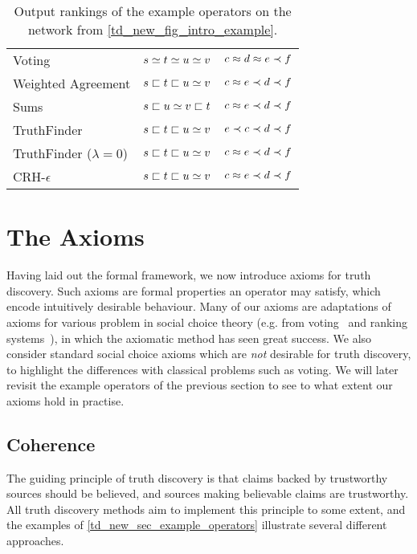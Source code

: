 \begin{table}
    \centering
	\caption{Output rankings of the example operators on the network from
    \cref{td_new_fig_intro_example}.}
	\begin{tabular}{lcc}
    \toprule
    Voting             & $s \simeq t \simeq u \simeq v$ & $c \approx d \approx e \prec f$ \\
    Weighted Agreement & $s \sqsubset t \sqsubset u \simeq v$ & $c \approx e \prec d \prec f$ \\
    Sums               & $s \sqsubset u \simeq v \sqsubset t$ & $c \approx e \prec d \prec f$ \\
    TruthFinder        & $s \sqsubset t \sqsubset u \simeq v$ & $e \prec c \prec d \prec f$ \\
    TruthFinder ($\lambda = 0$) & $s \sqsubset t \sqsubset u \simeq v$ & $c \approx e \prec d \prec f$ \\
    CRH-$\epsilon$     & $s \sqsubset t \sqsubset u \simeq v$ & $c \approx e \prec d \prec f$ \\
    \bottomrule
	\end{tabular}
    \label{td_new_tab_example_outputs}
\end{table}

\section{The Axioms}
\label{td_new_sec_axioms}

Having laid out the formal framework, we now introduce axioms for truth
discovery. Such axioms are formal properties an operator may satisfy, which
encode intuitively desirable behaviour. Many of our axioms are adaptations of
axioms for various problem in social choice theory (e.g. from
voting~\cite{zwicker2016voting} and ranking systems~\cite{altman2008}), in
which the axiomatic method has seen great success. We also consider standard
social choice axioms which are \emph{not} desirable for truth discovery, to
highlight the differences with classical problems such as voting. We will later
revisit the example operators of the previous section to see to what extent our
axioms hold in practise.

\subsection{Coherence}

The guiding principle of truth discovery is that claims backed by trustworthy
sources should be believed, and sources making believable claims are
trustworthy. All truth discovery methods aim to implement this principle to
some extent, and the examples of \cref{td_new_sec_example_operators} illustrate
several different approaches.

